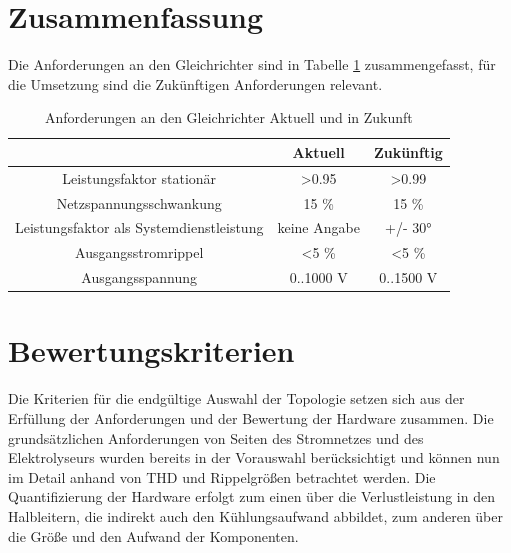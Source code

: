 \section{Zusammenfassung}
Die Anforderungen an den Gleichrichter sind in Tabelle \ref{tab:AnfZsm} zusammengefasst, für die Umsetzung sind die Zukünftigen Anforderungen relevant. \\
\begin{table}
	\centering
\caption{Anforderungen an den Gleichrichter Aktuell und in Zukunft}
\label{tab:AnfZsm}
\begin{tabular}{c|c|c}
	& Aktuell & Zukünftig \\
	\hline
	Leistungsfaktor stationär & >0.95 & >0.99 \\
	\hline
	Netzspannungsschwankung & 15 \% & 15 \% \\
	\hline
	Leistungsfaktor als Systemdienstleistung & keine Angabe & +/- 30° \\
	\hline
	Ausgangsstromrippel & <5 \% & <5 \% \\
	\hline
	Ausgangsspannung & 0..1000 V & 0..1500 V \\

\end{tabular}
\end{table}
\section{Bewertungskriterien}
Die Kriterien für die endgültige Auswahl der Topologie setzen sich aus der Erfüllung der Anforderungen und der Bewertung der Hardware zusammen. Die grundsätzlichen Anforderungen von Seiten des Stromnetzes und des Elektrolyseurs wurden bereits in der Vorauswahl berücksichtigt und können nun im Detail anhand von \gls{THD} und Rippelgrößen betrachtet werden. Die Quantifizierung der Hardware erfolgt zum einen über die Verlustleistung in den Halbleitern, die indirekt auch den Kühlungsaufwand abbildet, zum anderen über die Größe und den Aufwand der Komponenten.  